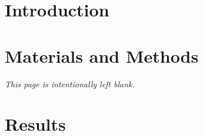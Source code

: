 \dedication{}

\begin{abstract}

\end{abstract}

\mainmatter

\chapter{Introduction}\label{introduction}


\chapter{Materials and Methods}\label{ch:materials-and-methods}\clearpage
{}
\vspace*{\fill}
\begin{center}{\large\emph{This page is intentionally left blank.}}\end{center}
\vspace*{\fill}

\chapter{Results}\label{ch:results}\clearpage

